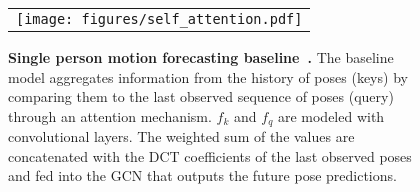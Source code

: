 \begin{figure}[t]
	\centering
	\begin{tabular}{c}
		\texttt{[image: figures/self\_attention.pdf]} \\
	\end{tabular}
	\caption[Single person motion forecasting baseline]{\textbf{Single person motion forecasting baseline~\cite{Mao20}.} The baseline model aggregates information from the history of poses (keys) by comparing them to the last observed sequence of poses (query) through an attention mechanism. $f_k$ and $f_q$ are modeled with convolutional layers. The weighted sum of the values are concatenated with the DCT coefficients of the last observed poses and fed into the GCN that outputs the future pose predictions.}
	\label{fig:baseline_3dmotion_forecasting}
\end{figure}